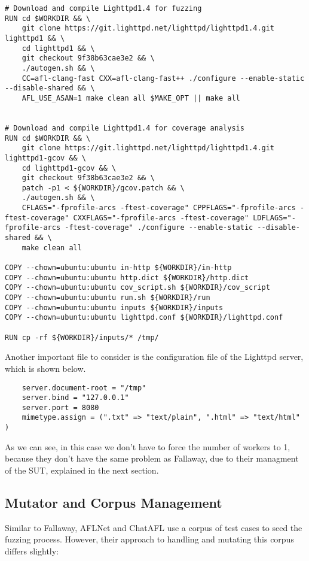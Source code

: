 \begin{lstlisting}
# Download and compile Lighttpd1.4 for fuzzing
RUN cd $WORKDIR && \
    git clone https://git.lighttpd.net/lighttpd/lighttpd1.4.git lighttpd1 && \
    cd lighttpd1 && \
    git checkout 9f38b63cae3e2 && \
    ./autogen.sh && \ 
    CC=afl-clang-fast CXX=afl-clang-fast++ ./configure --enable-static --disable-shared && \
    AFL_USE_ASAN=1 make clean all $MAKE_OPT || make all


# Download and compile Lighttpd1.4 for coverage analysis
RUN cd $WORKDIR && \
    git clone https://git.lighttpd.net/lighttpd/lighttpd1.4.git lighttpd1-gcov && \
    cd lighttpd1-gcov && \
    git checkout 9f38b63cae3e2 && \
    patch -p1 < ${WORKDIR}/gcov.patch && \
    ./autogen.sh && \ 
    CFLAGS="-fprofile-arcs -ftest-coverage" CPPFLAGS="-fprofile-arcs -ftest-coverage" CXXFLAGS="-fprofile-arcs -ftest-coverage" LDFLAGS="-fprofile-arcs -ftest-coverage" ./configure --enable-static --disable-shared && \
    make clean all

COPY --chown=ubuntu:ubuntu in-http ${WORKDIR}/in-http
COPY --chown=ubuntu:ubuntu http.dict ${WORKDIR}/http.dict
COPY --chown=ubuntu:ubuntu cov_script.sh ${WORKDIR}/cov_script
COPY --chown=ubuntu:ubuntu run.sh ${WORKDIR}/run
COPY --chown=ubuntu:ubuntu inputs ${WORKDIR}/inputs
COPY --chown=ubuntu:ubuntu lighttpd.conf ${WORKDIR}/lighttpd.conf

RUN cp -rf ${WORKDIR}/inputs/* /tmp/
\end{lstlisting}
Another important file to consider is the configuration file of the Lighttpd server, which is shown below.
\begin{lstlisting}
    server.document-root = "/tmp"
    server.bind = "127.0.0.1"
    server.port = 8080
    mimetype.assign = (".txt" => "text/plain", ".html" => "text/html" )
\end{lstlisting}
As we can see, in this case we don't have to force the number of workers to 1, because they don't have the same problem as Fallaway, due to their managment of the SUT, explained in the next section.

\subsection{Mutator and Corpus Management}

Similar to Fallaway, AFLNet and ChatAFL use a corpus of test cases to seed the fuzzing process. However, their approach to handling and mutating this corpus differs slightly:

